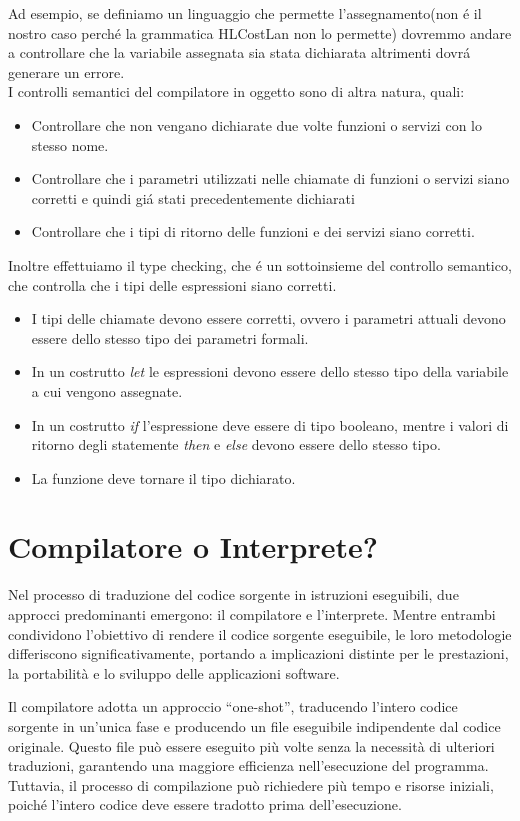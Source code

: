 \documentclass[../../main.tex]{subfiles}
\begin{document}
Ad esempio, se definiamo un linguaggio che permette l'assegnamento(non é il nostro caso perché la grammatica HLCostLan non lo permette) dovremmo andare a controllare che la variabile assegnata sia stata dichiarata altrimenti dovrá generare un errore.\\
I controlli semantici del compilatore in oggetto sono di altra natura, quali:
\begin{itemize}
    \item Controllare che non vengano dichiarate due volte funzioni o servizi con lo stesso nome.
    \item Controllare che i parametri utilizzati nelle chiamate di funzioni o servizi siano corretti e quindi giá stati precedentemente dichiarati
    \item Controllare che i tipi di ritorno delle funzioni e dei servizi siano corretti.
\end{itemize}
Inoltre effettuiamo il type checking, che é un sottoinsieme del controllo semantico, che controlla che i tipi delle espressioni siano corretti.\\
\begin{itemize}
    \item I tipi delle chiamate devono essere corretti, ovvero i parametri attuali devono essere dello stesso tipo dei parametri formali.
    \item In un costrutto \textit{let} le espressioni devono essere dello stesso tipo della variabile a cui vengono assegnate.
    \item In un costrutto \textit{if} l'espressione deve essere di tipo booleano, mentre i valori di ritorno degli statemente \textit{then} e \textit{else} devono essere dello stesso tipo.
    \item La funzione deve tornare il tipo dichiarato.
\end{itemize}
\section{Compilatore o Interprete?}
Nel processo di traduzione del codice sorgente in istruzioni eseguibili, due approcci predominanti emergono: il compilatore e l'interprete. Mentre entrambi condividono l'obiettivo di rendere il codice sorgente eseguibile, le loro metodologie differiscono significativamente, portando a implicazioni distinte per le prestazioni, la portabilità e lo sviluppo delle applicazioni software.

Il compilatore adotta un approccio ``one-shot'', traducendo l'intero codice sorgente in un'unica fase e producendo un file eseguibile indipendente dal codice originale. Questo file può essere eseguito più volte senza la necessità di ulteriori traduzioni, garantendo una maggiore efficienza nell'esecuzione del programma. Tuttavia, il processo di compilazione può richiedere più tempo e risorse iniziali, poiché l'intero codice deve essere tradotto prima dell'esecuzione.
\end{document}
